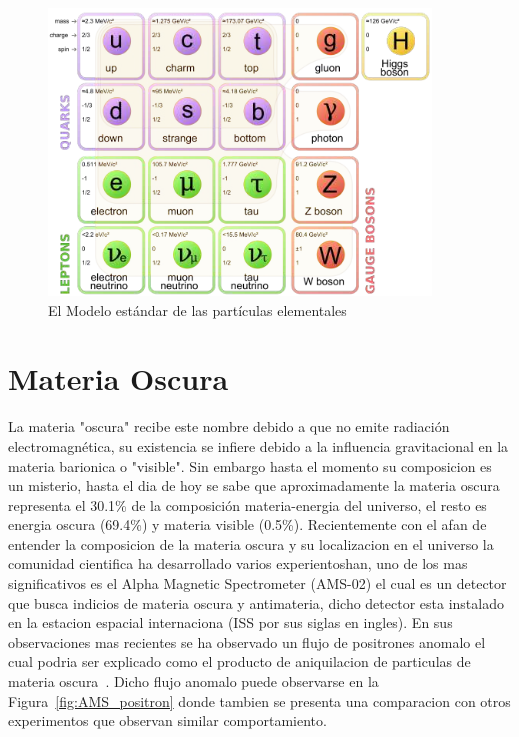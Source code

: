 \begin{figure}
\begin{center}
  \includegraphics[width=4.0in]{standard-model.png}
  \caption{El Modelo est\'andar de las part\'iculas elementales}
  \label{fig:ME}
\end{center}
\end{figure}


\section{Materia Oscura}

La materia "oscura" recibe este nombre debido a que no emite radiaci\'on electromagn\'etica, su existencia se infiere debido a la influencia gravitacional en la materia barionica o "visible". Sin embargo hasta el momento su composicion es un misterio, hasta el dia de hoy se sabe que aproximadamente la materia oscura representa el 30.1\%  de la composici\'on materia-energia del universo, el resto es energia oscura (69.4\%) y materia visible (0.5\%). Recientemente con el afan de entender la composicion de la materia oscura y su localizacion en el universo la comunidad cientifica ha desarrollado varios experientoshan, uno de los mas significativos es el Alpha Magnetic Spectrometer (AMS-02) el cual es un detector que busca indicios de materia oscura y antimateria, dicho detector esta instalado en la estacion espacial internaciona (ISS por sus siglas en ingles). En sus observaciones mas recientes se ha observado un flujo de positrones anomalo el cual podria ser explicado como el producto de aniquilacion de particulas de materia oscura~\cite{AMS}.  Dicho flujo anomalo puede observarse en la Figura~\ref{fig:AMS_positron} donde tambien se presenta una comparacion con otros experimentos que observan similar comportamiento. 


